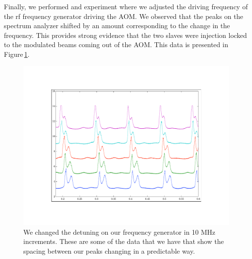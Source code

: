 

Finally, we performed and experiment where we adjusted the driving frequency of the rf frequency generator driving the AOM. We observed that the peaks on the spectrum analyzer shifted by an amount corresponding to the change in the frequency. This provides strong evidence that the two slaves were injection locked to the modulated beams coming out of the AOM. This data is presented in Figure\,\ref{fig:typicaldata}.



 
\begin{figure}
    \centerline{\includegraphics{sampleOffsetData}}
    \caption[]{\label{fig:typicaldata}
    We changed the detuning on our frequency generator in 10 MHz increments. These are some of the data that we have that show the spacing between our peaks changing in a predictable way.}
\end{figure}

